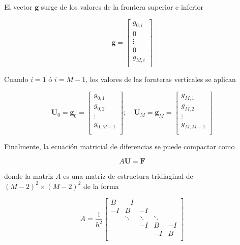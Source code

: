 \documentclass[12pt]{article}
\begin{document}
El vector $\mathbf{g}$ surge de los valores de la frontera superior e inferior

\begin{equation*}
\mathbf{g} = \begin{bmatrix}
g_{0,i} \\ 0 \\ \vdots \\ 0 \\ g_{M,i} \\
\end{bmatrix}
\end{equation*}

Cuando $i=1$ ó $i=M-1$, los valores de las fornteras verticales se aplican

\begin{equation*}
\mathbf{U}_0 = \mathbf{g}_0 = 
\begin{bmatrix}
g_{0,1} \\ g_{0,2} \\ \vdots \\ g_{0,M-1} \\
\end{bmatrix}; \quad
\mathbf{U}_M = \mathbf{g}_M = 
\begin{bmatrix}
g_{M,1} \\ g_{M,2} \\ \vdots \\ g_{M,M-1} \\
\end{bmatrix} 
\end{equation*}

Finalmente, la ecuación matricial de diferencias se puede compactar como 

\begin{equation*}
A \mathbf{U} = \mathbf{F}
\end{equation*}

donde la matriz $A$ es una matriz de estructura tridiaginal de $(M-2)^2 \times (M-2)^2$ de la forma

\begin{equation*}
A = \frac{1}{h^2} \begin{bmatrix}
B  & -I &   &  & \\
-I & B & -I &  & \\
    & \ddots & \ddots   & \ddots &  \\
    &   & -I & B & -I \\
    &  &    & -I & B \\   
\end{bmatrix}
\end{equation*}
\end{document}
